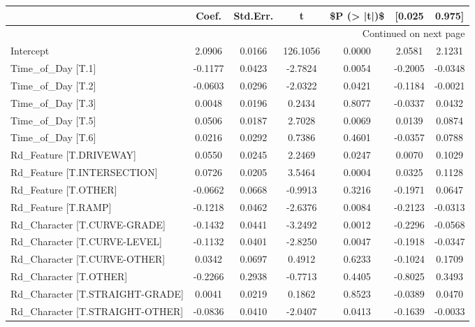 \begin{longtable}{p{4cm}cccccc}
\toprule
{} &   Coef. &  Std.Err. &        t &  \$P (> |t|)\$ &  [0.025 &  0.975] \\
\midrule
\endhead
\midrule
\multicolumn{7}{r}{{Continued on next page}} \\
\midrule
\endfoot

\bottomrule
\endlastfoot
Intercept                       &  2.0906 &    0.0166 & 126.1056 &       0.0000 &  2.0581 &  2.1231 \\
Time\_of\_Day [T.1]               & -0.1177 &    0.0423 &  -2.7824 &       0.0054 & -0.2005 & -0.0348 \\
Time\_of\_Day [T.2]               & -0.0603 &    0.0296 &  -2.0322 &       0.0421 & -0.1184 & -0.0021 \\
Time\_of\_Day [T.3]               &  0.0048 &    0.0196 &   0.2434 &       0.8077 & -0.0337 &  0.0432 \\
Time\_of\_Day [T.5]               &  0.0506 &    0.0187 &   2.7028 &       0.0069 &  0.0139 &  0.0874 \\
Time\_of\_Day [T.6]               &  0.0216 &    0.0292 &   0.7386 &       0.4601 & -0.0357 &  0.0788 \\
Rd\_Feature [T.DRIVEWAY]         &  0.0550 &    0.0245 &   2.2469 &       0.0247 &  0.0070 &  0.1029 \\
Rd\_Feature [T.INTERSECTION]     &  0.0726 &    0.0205 &   3.5464 &       0.0004 &  0.0325 &  0.1128 \\
Rd\_Feature [T.OTHER]            & -0.0662 &    0.0668 &  -0.9913 &       0.3216 & -0.1971 &  0.0647 \\
Rd\_Feature [T.RAMP]             & -0.1218 &    0.0462 &  -2.6376 &       0.0084 & -0.2123 & -0.0313 \\
Rd\_Character [T.CURVE-GRADE]    & -0.1432 &    0.0441 &  -3.2492 &       0.0012 & -0.2296 & -0.0568 \\
Rd\_Character [T.CURVE-LEVEL]    & -0.1132 &    0.0401 &  -2.8250 &       0.0047 & -0.1918 & -0.0347 \\
Rd\_Character [T.CURVE-OTHER]    &  0.0342 &    0.0697 &   0.4912 &       0.6233 & -0.1024 &  0.1709 \\
Rd\_Character [T.OTHER]          & -0.2266 &    0.2938 &  -0.7713 &       0.4405 & -0.8025 &  0.3493 \\
Rd\_Character [T.STRAIGHT-GRADE] &  0.0041 &    0.0219 &   0.1862 &       0.8523 & -0.0389 &  0.0470 \\
Rd\_Character [T.STRAIGHT-OTHER] & -0.0836 &    0.0410 &  -2.0407 &       0.0413 & -0.1639 & -0.0033 \\

\end{longtable}
